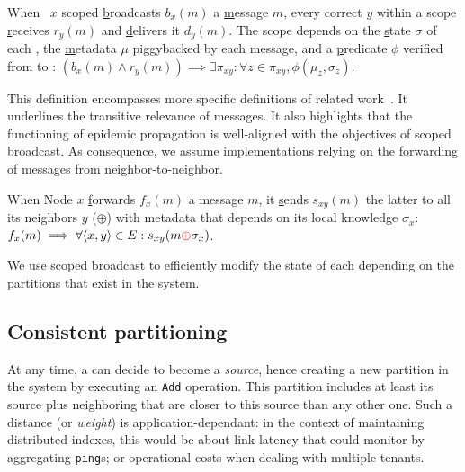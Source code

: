 \begin{definition}
  When \Process~$x$ scoped \underline{b}roadcasts $b_x(m)$ a
  \underline{m}essage $m$, every correct \process $y$ within a scope
  \underline{r}eceives $r_y(m)$ and \underline{d}elivers it
  $d_y(m)$. The scope depends on the \underline{s}tate $\sigma$ of
  each \process, the \underline{m}etadata $\mu$ piggybacked by each
  message, and a \underline{p}redicate $\phi$ verified from \process
  to \process:
  $(b_x(m) \wedge r_y(m)) \implies \exists \pi_{xy}: \forall z \in
  \pi_{xy}, \phi(\mu_z, \sigma_z)$.
\end{definition}

This definition encompasses more specific definitions of related
work~\cite{hsiao2005scoped, lue2006scoped, wang2015prodiluvian}. It
underlines the transitive relevance of messages. It also highlights
that the functioning of epidemic propagation is well-aligned with the
objectives of scoped broadcast. As consequence, we assume
implementations relying on the forwarding of messages from
neighbor-to-neighbor.

\begin{definition}
  When Node $x$ \underline{f}orwards $f_x(m)$ a message $m$, it
  \underline{s}ends $s_{xy}(m)$ the latter to all its neighbors $y$
   ($\oplus$) with metadata that depends on its local
  knowledge $\sigma_x$:
  $f_x(m) \implies \forall \langle x, y\rangle \in E: s_{xy}(m
  \textcolor{red}{\oplus} \sigma_x)$.
\end{definition}

We use scoped broadcast to efficiently modify the state of each
\process depending on the partitions that exist in the system.



\subsection{Consistent partitioning}
\label{subsec:consistent}

At any time, a \process can decide to become a \emph{source}, hence
creating a new partition in the system by executing an \texttt{Add}
operation. This partition includes at least its source plus
neighboring \processes that are closer to this source than any other
one. Such a distance (or \emph{weight}) is application-dependant: in
the context of maintaining distributed indexes, this would be about
link latency that \nodes could monitor by aggregating \texttt{ping}s;
or operational costs when dealing with multiple tenants.


